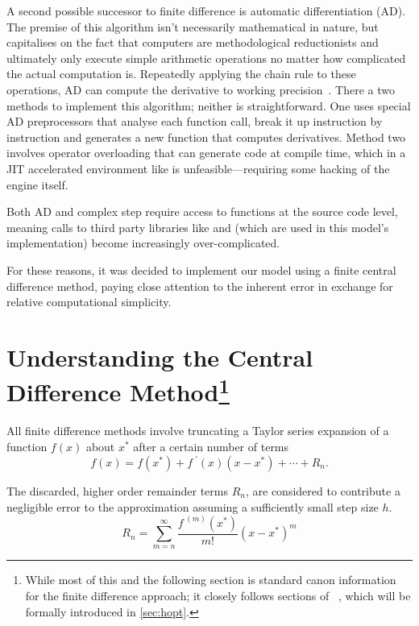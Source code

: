A second possible successor to finite difference is automatic differentiation (AD).
The premise of this algorithm isn't necessarily mathematical in nature, but capitalises on the fact that computers are methodological reductionists and ultimately only execute simple arithmetic operations no matter how complicated the actual computation is.
Repeatedly applying the chain rule to these operations, AD can compute the derivative to working precision~\cite{Kedem1980}.
There a two methods to implement this algorithm; neither is straightforward.
One uses special AD preprocessors that analyse each function call, break it up instruction by instruction and generates a new function that computes derivatives.
Method two involves operator overloading that can generate code at compile time, which in a JIT accelerated environment like  is unfeasible---requiring some hacking of the engine itself.

Both AD and complex step require access to functions at the source code level, meaning calls to third party libraries like  and  (which are used in this model's implementation) become increasingly over-complicated.

For these reasons, it was decided to implement our model using a finite central difference method, paying close attention to the inherent error in exchange for relative computational simplicity.

\section[Understanding the Central Difference Method][Understanding Central Differences]{Understanding the Central Difference Method\footnote{While most of this and the following section is standard canon information for the finite difference approach; it closely follows sections of \citeauthor{Mathur2012}~\cite{Mathur2012}, which will be formally introduced in \cref{sec:hopt}.}}\label{sec:ucdiff}

All finite difference methods involve truncating a Taylor series expansion of a function $f(x)$ about $x^*$ after a certain number of terms
\begin{equation}
    f(x) = f(x^*) + f^{\;\prime}(x)(x-x^*) + \cdots + R_n.
\end{equation}

The discarded, higher order remainder terms $R_n$, are considered to contribute a negligible error to the approximation assuming a sufficiently small step size $h$.
\begin{equation}
    R_n = \sum_{m=n}^\infty \frac{f^{\;(m)}(x^*)}{m!}(x-x^*)^m
\end{equation}

